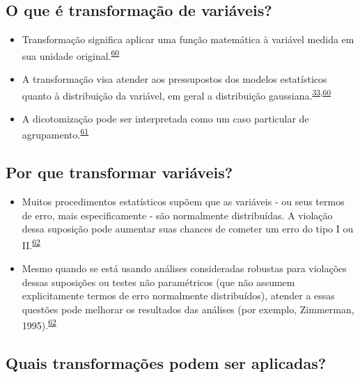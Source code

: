 \documentclass[
  a4paper,
]{book}
\begin{document}
\hypertarget{o-que-uxe9-transformauxe7uxe3o-de-variuxe1veis}{%
\subsection{O que é transformação de variáveis?}\label{o-que-uxe9-transformauxe7uxe3o-de-variuxe1veis}}

\begin{itemize}
\item
  Transformação significa aplicar uma função matemática à variável medida em sua unidade original.\textsuperscript{\protect\hyperlink{ref-Bland1996}{60}}
\item
  A transformação visa atender aos pressupostos dos modelos estatísticos quanto à distribuição da variável, em geral a distribuição gaussiana.\textsuperscript{\protect\hyperlink{ref-vetter2017}{33},\protect\hyperlink{ref-Bland1996}{60}}
\item
  A dicotomização pode ser interpretada como um caso particular de agrupamento.\textsuperscript{\protect\hyperlink{ref-Fedorov2009}{61}}
\end{itemize}

\hypertarget{por-que-transformar-variuxe1veis}{%
\subsection{Por que transformar variáveis?}\label{por-que-transformar-variuxe1veis}}

\begin{itemize}
\item
  Muitos procedimentos estatísticos supõem que as variáveis - ou seus termos de erro, mais especificamente - são normalmente distribuídas. A violação dessa suposição pode aumentar suas chances de cometer um erro do tipo I ou II.\textsuperscript{\protect\hyperlink{ref-osborne2010}{62}}
\item
  Mesmo quando se está usando análises consideradas robustas para violações dessas suposições ou testes não paramétricos (que não assumem explicitamente termos de erro normalmente distribuídos), atender a essas questões pode melhorar os resultados das análises (por exemplo, Zimmerman, 1995).\textsuperscript{\protect\hyperlink{ref-osborne2010}{62}}
\end{itemize}

\hypertarget{quais-transformauxe7uxf5es-podem-ser-aplicadas}{%
\subsection{Quais transformações podem ser aplicadas?}\label{quais-transformauxe7uxf5es-podem-ser-aplicadas}}
\end{document}

